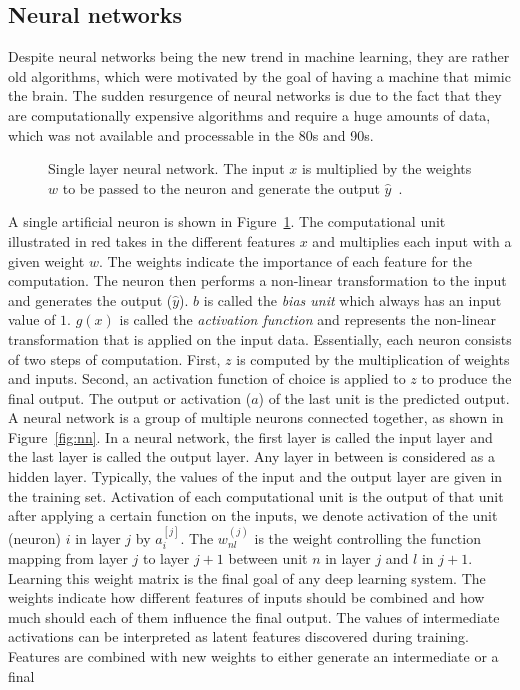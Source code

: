 \subsection{Neural networks}
Despite neural networks being the new trend in machine learning, they are rather old algorithms, which were motivated by the goal of having a machine that mimic the brain. The sudden resurgence of neural networks is due to the fact that they are computationally expensive algorithms and require a huge amounts of data, which was not available and processable in the 80s and 90s. \\
\begin{figure}
\centering 
\resizebox{0.55\textwidth}{0.3\textwidth}{      

}
\caption{Single layer neural network. The input $x$ is multiplied by the weights $w$ to be passed to the neuron and generate the output $\hat { y }$~.}
\label{fig:preceptron}
\end{figure}
A single artificial neuron is shown in Figure~\ref{fig:preceptron}. The computational unit illustrated in red takes in the different features $x$ and multiplies each input with a given weight $w$. The weights indicate the importance of each feature for the computation. The neuron then performs a non-linear transformation to the input and generates the output ($\hat { y } $). $b$ is called the \emph{bias unit} which always has an input value of $1$. $g(x)$ is called the \emph{activation
function} and represents the non-linear transformation that is applied on the input data. Essentially, each neuron consists of two steps of computation. First, $z$ is computed by the multiplication of weights and inputs. Second, an activation function of choice is applied to $z$ to produce the final output. The output or activation ($a$) of the last unit is the predicted output. A neural network is a group of multiple neurons connected together, as shown in Figure~\ref{fig:nn}. In a
neural network, the first layer is called the input layer and the last layer is called the output layer. Any layer in between is considered as a hidden layer. Typically, the values of the input and the output layer are given in the training set. Activation of each computational unit is the output of that unit after applying a certain function on the inputs, we denote activation of the unit (neuron) $i$ in layer $j$ by $a_{i}^{[j]}$. The $w^{(j)}_{nl}$ is the weight controlling the function mapping from layer $j$ to layer $j+1$ between unit $n$ in layer $j$ and $l$ in $j+1$. Learning this weight matrix is the final goal of any deep learning system. The weights indicate how different features of inputs should be combined and how much should each of them influence the final output. The values of intermediate activations can be interpreted as latent features discovered during training. Features are combined with new weights to either generate an intermediate or a final
